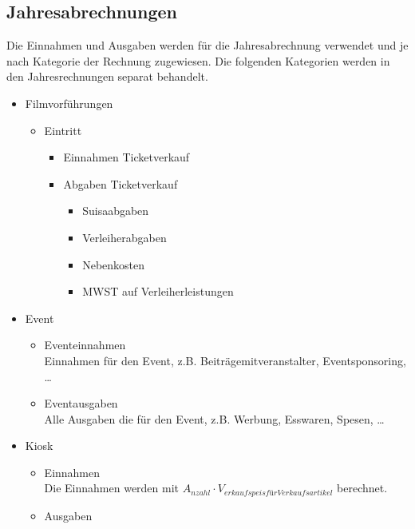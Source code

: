 \documentclass[
]{article}
\providecommand{\tightlist}{%
  \setlength{\itemsep}{0pt}\setlength{\parskip}{0pt}}
\begin{document}
\subsection{Jahresabrechnungen}\label{jahresabrechnungen}

Die Einnahmen und Ausgaben werden für die Jahresabrechnung verwendet und
je nach Kategorie der Rechnung zugewiesen. Die folgenden Kategorien
werden in den Jahresrechnungen separat behandelt.

\begin{itemize}
\tightlist
\item
  Filmvorführungen

  \begin{itemize}
  \tightlist
  \item
    Eintritt

    \begin{itemize}
    \tightlist
    \item
      Einnahmen Ticketverkauf
    \item
      Abgaben Ticketverkauf

      \begin{itemize}
      \tightlist
      \item
        Suisaabgaben
      \item
        Verleiherabgaben
      \item
        Nebenkosten
      \item
        MWST auf Verleiherleistungen
      \end{itemize}
    \end{itemize}
  \end{itemize}
\item
  Event

  \begin{itemize}
  \tightlist
  \item
    Eventeinnahmen\\
    Einnahmen für den Event, z.B. Beiträgemitveranstalter,
    Eventsponsoring, \ldots{}
  \item
    Eventausgaben\\
    Alle Ausgaben die für den Event, z.B. Werbung, Esswaren, Spesen,
    \ldots{}
  \end{itemize}
\item
  Kiosk

  \begin{itemize}
  \tightlist
  \item
    Einnahmen\\
    Die Einnahmen werden mit
    \(A_{nzahl} \cdot V_{erkaufspeis für Verkaufsartikel}\) berechnet.
  \item
    Ausgaben


\end{itemize}
\end{itemize}
\end{document}

